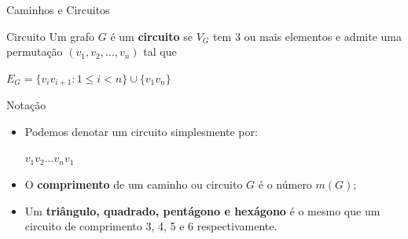 \documentclass[xcolor=dvipsnames,table]{beamer}
\begin{document}
	\begin{frame}[shrink]{Caminhos e Circuitos}
		\begin{block}{Circuito}
			Um grafo $G$ é um {\bf circuito} se $V_G$ tem 3 ou mais elementos e admite uma permutação $(v_1, v_2, \ldots , v_n)$ tal que
			\begin{center}
				$E_G = \{ v_i v_{i +1} : 1 \leq i < n \} \cup \{ v_1 v_n \}$
			\end{center} 
		\end{block} \pause
		\begin{block}{Notação}
			\begin{itemize}
				\item Podemos denotar um circuito simplesmente por: \pause
				\begin{center}
					$v_1 v_2 \ldots v_n v_1$		
				\end{center}
				\item O {\bf comprimento} de um caminho ou circuito $G$ é o número $m(G)$; \pause
				\item Um {\bf triângulo, quadrado, pentágono {e} hexágono} é o mesmo que um circuito de comprimento 3, 4, 5 e 6 respectivamente.
			\end{itemize}
		\end{block}
	\end{frame}
	
	\begin{frame}
		\titlepage
	\end{frame}
	
\end{document}
